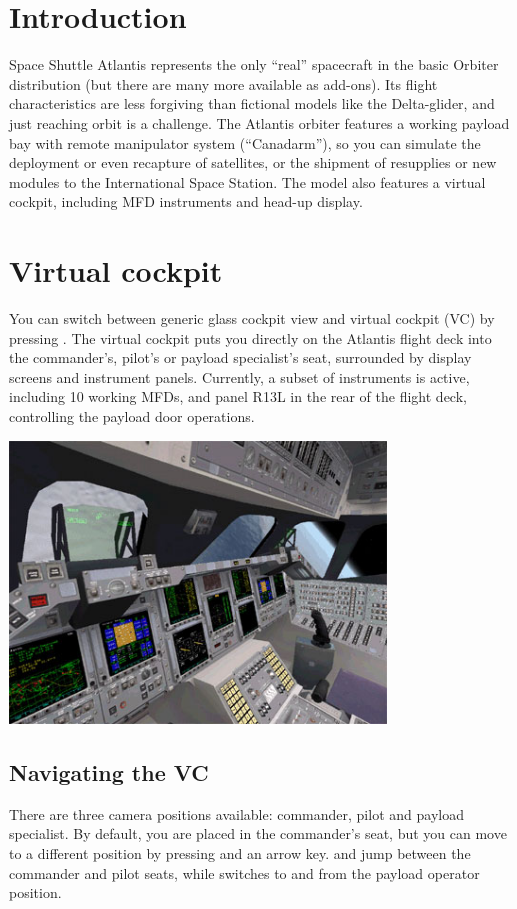 \newpage
\section{Introduction}
Space Shuttle Atlantis represents the only “real” spacecraft in the basic Orbiter distribution (but there are many more available as add-ons). Its flight characteristics are less forgiving than fictional models like the Delta-glider, and just reaching orbit is a challenge.
The Atlantis orbiter features a working payload bay with remote manipulator system (“Canadarm”), so you can simulate the deployment or even recapture of satellites, or the shipment of resupplies or new modules to the International Space Station.
The model also features a virtual cockpit, including MFD instruments and head-up display.

\section{Virtual cockpit}
You can switch between generic glass cockpit view and virtual cockpit (VC) by pressing . The virtual cockpit puts you directly on the Atlantis flight deck into the commander’s, pilot’s or payload specialist’s seat, surrounded by display screens and instrument panels. Currently, a subset of instruments is active, including 10 working MFDs, and panel R13L in the rear of the flight deck, controlling the payload door operations.

\begin{center}
\includegraphics[width=0.75\textwidth]{Images//Pic2.jpg}
\end{center}

\break
\subsection{Navigating the VC}
There are three camera positions available: commander, pilot and payload specialist. By default, you are placed in the commander’s seat, but you can move to a different position by pressing  and an arrow key.  \ks{$\rightarrow$} and \ks{$\leftarrow$} jump between the commander and pilot seats, while \ks{$\downarrow$} switches to and from the payload operator position.\\

